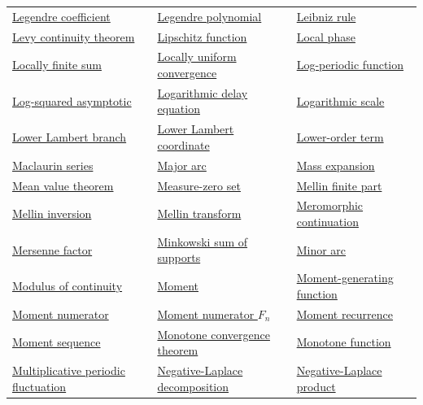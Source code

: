 \documentclass[11pt,oneside]{article}
\begin{document}
\begin{longtable}{p{}p{}p{}}
\hyperlink{gls:legendre-coefficient}{Legendre coefficient} & \hyperlink{gls:legendre-polynomial}{Legendre polynomial} & \hyperlink{gls:leibniz-rule}{Leibniz rule} \\
\hyperlink{gls:levy-continuity-theorem}{Levy continuity theorem} & \hyperlink{gls:lipschitz-function}{Lipschitz function} & \hyperlink{gls:local-phase}{Local phase} \\
\hyperlink{gls:locally-finite-sum}{Locally finite sum} & \hyperlink{gls:locally-uniform-convergence}{Locally uniform convergence} & \hyperlink{gls:log-periodic-function}{Log-periodic function} \\
\hyperlink{gls:log-squared-asymptotic}{Log-squared asymptotic} & \hyperlink{gls:logarithmic-delay-equation}{Logarithmic delay equation} & \hyperlink{gls:logarithmic-scale}{Logarithmic scale} \\
\hyperlink{gls:lower-lambert-branch}{Lower Lambert branch} & \hyperlink{gls:lower-lambert-coordinate}{Lower Lambert coordinate} & \hyperlink{gls:lower-order-term}{Lower-order term} \\
\hyperlink{gls:maclaurin-series}{Maclaurin series} & \hyperlink{gls:major-arc}{Major arc} & \hyperlink{gls:mass-expansion}{Mass expansion} \\
\hyperlink{gls:mean-value-theorem}{Mean value theorem} & \hyperlink{gls:measure-zero-set}{Measure-zero set} & \hyperlink{gls:mellin-finite-part}{Mellin finite part} \\
\hyperlink{gls:mellin-inversion}{Mellin inversion} & \hyperlink{gls:mellin-transform}{Mellin transform} & \hyperlink{gls:meromorphic-continuation}{Meromorphic continuation} \\
\hyperlink{gls:mersenne-factor}{Mersenne factor} & \hyperlink{gls:minkowski-sum-of-supports}{Minkowski sum of supports} & \hyperlink{gls:minor-arc}{Minor arc} \\
\hyperlink{gls:modulus-of-continuity}{Modulus of continuity} & \hyperlink{gls:moment}{Moment} & \hyperlink{gls:moment-generating-function}{Moment-generating function} \\
\hyperlink{gls:moment-numerator}{Moment numerator} & \hyperlink{gls:moment-numerator-f}{Moment numerator $F_n$} & \hyperlink{gls:moment-recurrence}{Moment recurrence} \\
\hyperlink{gls:moment-sequence}{Moment sequence} & \hyperlink{gls:monotone-convergence-theorem}{Monotone convergence theorem} & \hyperlink{gls:monotone-function}{Monotone function} \\
\hyperlink{gls:multiplicative-periodic-fluctuation}{Multiplicative periodic fluctuation} & \hyperlink{gls:negative-laplace-decomposition}{Negative-Laplace decomposition} & \hyperlink{gls:negative-laplace-product}{Negative-Laplace product} \\

\end{longtable}
\end{document}
